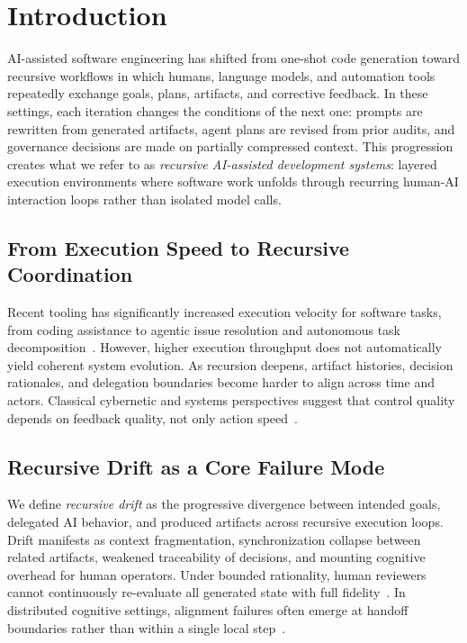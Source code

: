 \section{Introduction}
\label{sec:introduction}

AI-assisted software engineering has shifted from one-shot code generation toward recursive workflows in which humans, language models, and automation tools repeatedly exchange goals, plans, artifacts, and corrective feedback. In these settings, each iteration changes the conditions of the next one: prompts are rewritten from generated artifacts, agent plans are revised from prior audits, and governance decisions are made on partially compressed context. This progression creates what we refer to as \textit{recursive AI-assisted development systems}: layered execution environments where software work unfolds through recurring human-AI interaction loops rather than isolated model calls.

\subsection{From Execution Speed to Recursive Coordination}

Recent tooling has significantly increased execution velocity for software tasks, from coding assistance to agentic issue resolution and autonomous task decomposition~\cite{Chen2021Codex,Jimenez2024SWEBench,Yang2024SWEAgent}. However, higher execution throughput does not automatically yield coherent system evolution. As recursion deepens, artifact histories, decision rationales, and delegation boundaries become harder to align across time and actors. Classical cybernetic and systems perspectives suggest that control quality depends on feedback quality, not only action speed~\cite{Wiener1948Cybernetics,Beer1972BrainFirm}.

\subsection{Recursive Drift as a Core Failure Mode}

We define \textit{recursive drift} as the progressive divergence between intended goals, delegated AI behavior, and produced artifacts across recursive execution loops. Drift manifests as context fragmentation, synchronization collapse between related artifacts, weakened traceability of decisions, and mounting cognitive overhead for human operators. Under bounded rationality, human reviewers cannot continuously re-evaluate all generated state with full fidelity~\cite{Simon1957ModelsMan,Sweller1988CognitiveLoad}. In distributed cognitive settings, alignment failures often emerge at handoff boundaries rather than within a single local step~\cite{Hutchins1995CognitionWild}.

